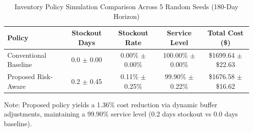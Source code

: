 \begin{table}[htbp]
\centering
\caption{Inventory Policy Simulation Comparison Across 5 Random Seeds (180-Day Horizon)}
\label{tab:inventory_comparison}
\begin{tabular}{lcccc}
\toprule
\textbf{Policy} & \textbf{Stockout Days} & \textbf{Stockout Rate} & \textbf{Service Level} & \textbf{Total Cost (\$)} \\
\midrule
Conventional Baseline & 0.0 $\pm$ 0.00 & 0.00\% $\pm$ 0.00\% & 100.00\% $\pm$ 0.00\% & \$1699.64 $\pm$ \$22.63 \\
Proposed Risk-Aware & 0.2 $\pm$ 0.45 & 0.11\% $\pm$ 0.25\% & 99.90\% $\pm$ 0.22\% & \$1676.58 $\pm$ \$16.62 \\
\bottomrule
\end{tabular}
\begin{flushleft}
\small Note: Proposed policy yields a 1.36\% cost reduction via dynamic buffer adjustments, maintaining a 99.90\% service level (0.2 days stockout vs 0.0 days baseline).
\end{flushleft}
\end{table}
